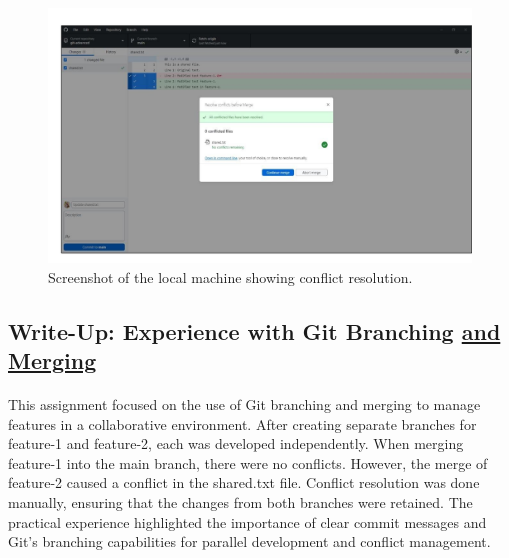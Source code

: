 \documentclass[a4paper,12pt]{article}
\begin{document}
\vspace{-2cm}
\begin{figure}[h!]
    \centering
    \includegraphics[width=0.8\linewidth]{conflict.png} %
    \hspace{4 cm}
    \caption{Screenshot of the local machine showing conflict resolution.}
\end{figure}

\subsection*{\LARGE{Write-Up: Experience with Git Branching {\underline{and Merging}}}}
\hspace{1 cm}
\paragraph{}
\begin{flushleft}
\Large{
This assignment focused on the use of Git branching and merging to manage features in a collaborative environment. After creating separate branches for feature-1 and feature-2, each was developed independently.
When merging feature-1 into the main branch, there were no conflicts. However, the merge of feature-2 caused a conflict in the shared.txt file. Conflict resolution was done manually, ensuring that the changes from both branches were retained.
The practical experience highlighted the importance of clear commit messages and Git’s branching capabilities for parallel development and conflict management.}
\end{flushleft}
\newpage
{}
\vspace{-2cm}
\end{document}
